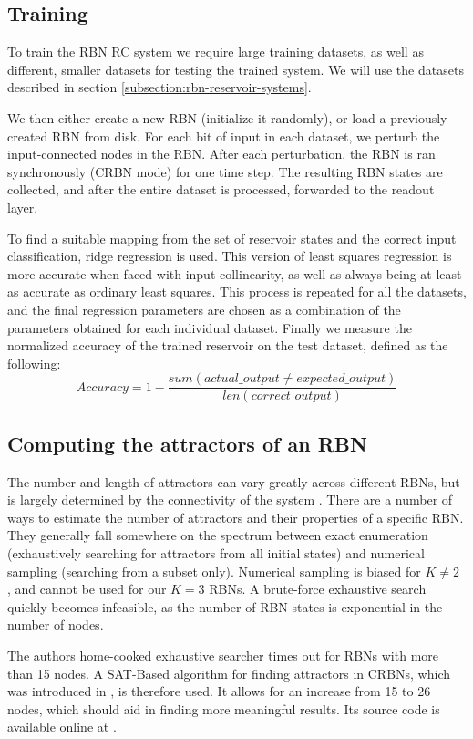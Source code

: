 \subsection{Training}

To train the RBN RC system we require large training datasets,
as well as different, smaller datasets for testing the trained system.
We will use the datasets described in section \ref{subsection:rbn-reservoir-systems}.

We then either create a new RBN (initialize it randomly),
or load a previously created RBN from disk.
For each bit of input in each dataset,
we perturb the input-connected nodes in the RBN.
After each perturbation, the RBN is ran synchronously (CRBN mode) for one time step.
The resulting RBN states are collected,
and after the entire dataset is processed,
forwarded to the readout layer.

To find a suitable mapping from the set of reservoir states and the correct input classification,
ridge regression \cite{hoerl1970ridge} is used.
This version of least squares regression is more accurate when faced with input collinearity, as well as always being at least as accurate as ordinary least squares.  
This process is repeated for all the datasets,
and the final regression parameters are chosen as a combination of the parameters obtained for each individual dataset.
Finally we measure the normalized accuracy of the trained reservoir on the test dataset,
defined as the following:
\begin{equation}
Accuracy = 1 - \dfrac{sum(actual\_output \neq expected\_output)}{len(correct\_output)}
\label{formula:accuracy}
\end{equation}

\subsection{Computing the attractors of an RBN}
\label{section:computing-attractors}

The number and length of attractors can vary greatly across different RBNs,
but is largely determined by the connectivity of the system \cite{gershenson2004introduction}.
There are a number of ways to estimate the number of attractors and their properties of a specific RBN.
They generally fall somewhere on the spectrum between exact enumeration (exhaustively searching for attractors from all initial states) and numerical sampling (searching from a subset only).
Numerical sampling is biased for $K\neq2$ \cite{berdahl2009random}, and cannot be used for our $K=3$ RBNs.
A brute-force exhaustive search quickly becomes infeasible, as the number of RBN states is exponential in the number of nodes.

The authors home-cooked exhaustive searcher times out for RBNs with more than 15 nodes.
A SAT-Based algorithm for finding attractors in CRBNs,
which was introduced in \cite{dubrova2011sat},
is therefore used.
It allows for an increase from 15 to 26 nodes,
which should aid in finding more meaningful results.
Its source code is available online at \cite{dubrova2011sat-online}.
